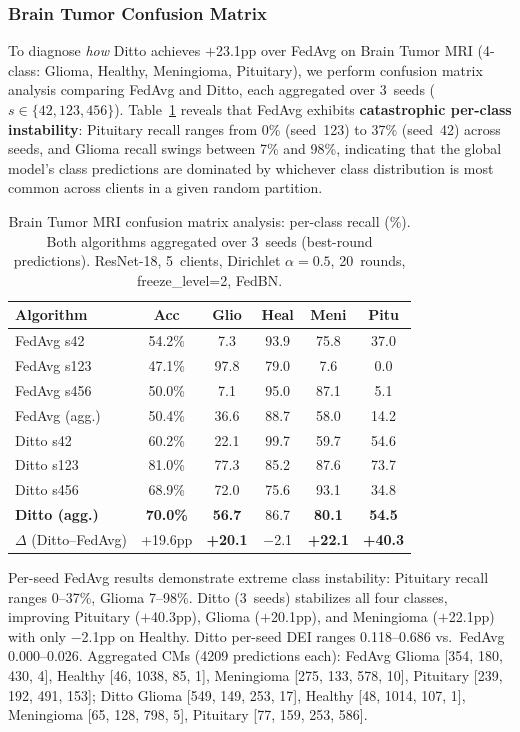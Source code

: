 \documentclass[conference]{IEEEtran}
\begin{document}
\subsubsection{Brain Tumor Confusion Matrix}
\label{sec:confusion_matrix_bt}

To diagnose \textit{how} Ditto achieves $+$23.1pp over FedAvg on Brain Tumor MRI (4-class: Glioma, Healthy, Meningioma, Pituitary), we perform confusion matrix analysis comparing FedAvg and Ditto, each aggregated over 3~seeds ($s \in \{42, 123, 456\}$). Table~\ref{tab:confusion_matrix_bt} reveals that FedAvg exhibits \textbf{catastrophic per-class instability}: Pituitary recall ranges from 0\% (seed~123) to 37\% (seed~42) across seeds, and Glioma recall swings between 7\% and 98\%, indicating that the global model's class predictions are dominated by whichever class distribution is most common across clients in a given random partition.

\begin{table}[htbp]
\centering
\caption{Brain Tumor MRI confusion matrix analysis: per-class recall (\%). Both algorithms aggregated over 3~seeds (best-round predictions). ResNet-18, 5~clients, Dirichlet $\alpha{=}0.5$, 20~rounds, freeze\_level=2, FedBN.}
\label{tab:confusion_matrix_bt}
\small
\begin{tabular}{lccccc}
\toprule
\textbf{Algorithm} & \textbf{Acc} & \textbf{Glio} & \textbf{Heal} & \textbf{Meni} & \textbf{Pitu} \\
\midrule
FedAvg s42 & 54.2\% & 7.3 & 93.9 & 75.8 & 37.0 \\
FedAvg s123 & 47.1\% & 97.8 & 79.0 & 7.6 & 0.0 \\
FedAvg s456 & 50.0\% & 7.1 & 95.0 & 87.1 & 5.1 \\
\midrule
FedAvg (agg.) & 50.4\% & 36.6 & 88.7 & 58.0 & 14.2 \\
\midrule
Ditto s42 & 60.2\% & 22.1 & 99.7 & 59.7 & 54.6 \\
Ditto s123 & 81.0\% & 77.3 & 85.2 & 87.6 & 73.7 \\
Ditto s456 & 68.9\% & 72.0 & 75.6 & 93.1 & 34.8 \\
\midrule
\textbf{Ditto (agg.)} & \textbf{70.0\%} & \textbf{56.7} & 86.7 & \textbf{80.1} & \textbf{54.5} \\
\midrule
$\Delta$ (Ditto--FedAvg) & +19.6pp & \textbf{+20.1} & $-$2.1 & \textbf{+22.1} & \textbf{+40.3} \\
\bottomrule
\end{tabular}

\vspace{1mm}
\footnotesize{Per-seed FedAvg results demonstrate extreme class instability: Pituitary recall ranges 0--37\%, Glioma 7--98\%. Ditto (3~seeds) stabilizes all four classes, improving Pituitary ($+$40.3pp), Glioma ($+$20.1pp), and Meningioma ($+$22.1pp) with only $-$2.1pp on Healthy. Ditto per-seed DEI ranges 0.118--0.686 vs.\ FedAvg 0.000--0.026. Aggregated CMs (4209 predictions each): FedAvg Glioma [354, 180, 430, 4], Healthy [46, 1038, 85, 1], Meningioma [275, 133, 578, 10], Pituitary [239, 192, 491, 153]; Ditto Glioma [549, 149, 253, 17], Healthy [48, 1014, 107, 1], Meningioma [65, 128, 798, 5], Pituitary [77, 159, 253, 586].}
\end{table}
\end{document}
